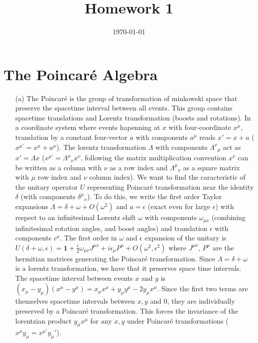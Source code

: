 \documentclass[10pt, a4paper]{article}
\title{Homework 1} %
\author{\PA} %
\date{\today} %
\begin{document}
\maketitlepage

\maketableofcontents


\section{The Poincaré Algebra}
\begin{enumerate}
  \item[(a)] The Poincaré is the group of transformation of minkowski space that preserve the spacetime interval between all events. This group contains spacetime translations and Lorentz transformation (boosts and rotations). In a coordinate system where events hapenning at $x$ with four-coordinate $x^{\mu}$, translation by a constant four-vector $a$ with components  $a^\mu$ reads $x' = x + a$ ($x^{\mu'} = x^{\mu} + a^{\mu}$). The lorentz transformation $\Lambda$ with components $\Lambda^{\nu}{}_{\mu}$ act as $x' = \Lambda x$ ($x^{\mu'} = \Lambda^{\mu}{}_{\nu} x^{\nu}$, following the matrix multiplication convention $x^\nu$ can be written as a column with $\nu$ as a row index and $\Lambda^{\mu}{}_{\nu}$ as a square matrix with $\mu$ row index and $\nu$ column index). We want to find the caracteristic of the unitary operator $U$ representing Poincaré transformation near the identity $\delta$ (with components $\delta^{\mu}{}_{\nu}$). To do this, we write the first order Taylor expansions $\Lambda = \delta + \omega + O(\omega^2)$ and $a = \epsilon$ (exact even for large $\epsilon$) with respect to an infinitesimal Lorentz shift $\omega$ with components $\omega_{\mu \nu}$ (combining infinitesimal rotation angles, and boost angles) and translation $\epsilon$ with components $\epsilon^\mu$. The first order in $\omega$ and $\epsilon$ expansion of the unitary is $U(\delta+\omega, \epsilon)=\mathbf{1}+\frac{i}{2} \omega_{\mu \nu} J^{\mu \nu}+i \epsilon_\mu P^\mu + O(\omega^2, \epsilon^2)$ where $J^{\mu \nu}$, $P^\mu$ are the hermitian matrices generating the Poincaré transformation. Since $\Lambda = \delta + \omega$ is a lorentz transformation, we have that it preserves space time intervals. The spacetime interval between events $x$ and $y$ is $(x_\mu-y_\mu)(x^\mu-y^\mu) = x_\mu x^\mu + y_\mu y^\mu - 2 y_\mu x^\mu $. Since the first two terms are themselves spacetime intervals between $x, y$ and $0$, they are individually preserved by a Poincaré transformation. This forces the invariance of the lorentzian product $y_\mu x^\mu$ for any $x, y$ under Poincaré transformations ($x^\mu y_\mu = x^{\mu'} y_\mu'$).
  

\end{enumerate}
\end{document}

